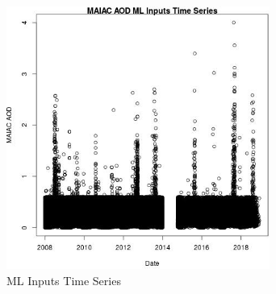 \begin{figure} 
\centering  
\includegraphics[width=0.77\textwidth]{Code_Outputs/Report_ML_input_PM25_Step4_part_e_de_duplicated_aves_MAIAC_AODvDate.jpg} 
\caption{\label{fig:Report_ML_input_PM25_Step4_part_e_de_duplicated_avesMAIAC_AODvDate}ML Inputs Time Series} 
\end{figure} 
 
